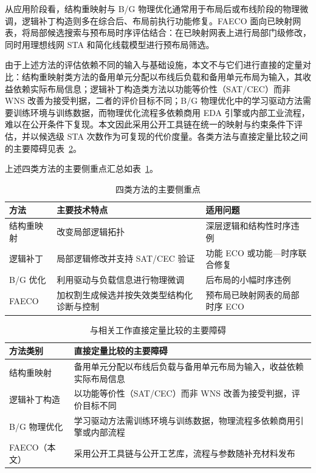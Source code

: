 \documentclass[twocolumn,10pt,fontset=windows]{ctexart}
\begin{document}
从应用阶段看，结构重映射与 B/G 物理优化通常用于布局后或布线阶段的物理微调，逻辑补丁构造则多在综合后、布局前执行功能修复。FAECO 面向已映射网表，将局部候选搜索与预布局时序评估结合：在已映射网表上进行局部门级修改，同时用理想线网 STA 和简化线载模型进行预布局筛选。

由于上述方法的评估依赖不同的输入与基础设施，本文不与它们进行直接的定量对比：结构重映射类方法的备用单元分配以布线后负载和备用单元布局为输入，其收益依赖实际布局信息；逻辑补丁构造类方法以功能等价性（SAT/CEC）而非 WNS 改善为接受判据，二者的评价目标不同；B/G 物理优化中的学习驱动方法需要训练环境与训练数据，而物理优化流程多依赖商用 EDA 引擎或内部工业流程，难以在公开条件下复现。本文因此采用公开工具链在统一的映射与约束条件下评估，并以候选级 STA 次数作为可复现的代价度量。各类方法与直接定量比较之间的主要障碍见表~\ref{tab:baseline_cmp}。

上述四类方法的主要侧重点汇总如表~\ref{tab:related_diff}。

\begin{table}[H]
\centering
\caption{四类方法的主要侧重点}
\label{tab:related_diff}
\footnotesize
\setlength{\tabcolsep}{2pt}
\begin{tabular}{>{\raggedright\arraybackslash}p{1.55cm}>{\raggedright\arraybackslash}p{2.55cm}>{\raggedright\arraybackslash}p{3.2cm}}
\toprule
\textbf{方法} & \textbf{主要技术特点} & \textbf{适用问题} \\
\midrule
结构重映射 & 改变局部逻辑拓扑 & 深层逻辑和结构性时序违例 \\
逻辑补丁 & 局部逻辑修改并支持 SAT/CEC 验证 & 功能 ECO 或功能—时序联合修复 \\
B/G 优化 & 利用驱动与负载信息进行物理微调 & 后布局的小幅时序违例 \\
FAECO & 加权割生成候选并按失效类型结构化诊断与控制 & 预布局已映射网表的局部时序 ECO \\
\bottomrule
\end{tabular}
\end{table}

\begin{table}[ht]
\centering
\caption{与相关工作直接定量比较的主要障碍}
\label{tab:baseline_cmp}
\footnotesize
\setlength{\tabcolsep}{3pt}
\begin{tabular}{>{\raggedright\arraybackslash}p{2.3cm}>{\raggedright\arraybackslash}p{5.0cm}}
\toprule
\textbf{方法类别} & \textbf{直接定量比较的主要障碍} \\
\midrule
结构重映射 & 备用单元分配以布线后负载与备用单元布局为输入，收益依赖实际布局信息 \\
逻辑补丁构造 & 以功能等价性（SAT/CEC）而非 WNS 改善为接受判据，评价目标不同 \\
B/G 物理优化 & 学习驱动方法需训练环境与训练数据，物理流程多依赖商用引擎或内部流程 \\
FAECO（本文） & 采用公开工具链与公开工艺库，流程与参数随补充材料发布 \\
\bottomrule
\end{tabular}
\end{table}
\end{document}
